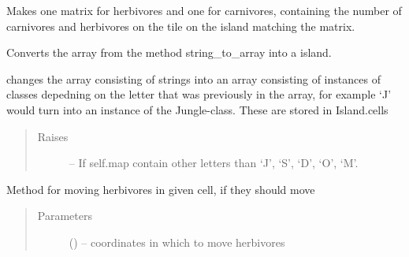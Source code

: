 \documentclass[a4paper,10pt,english]{sphinxmanual}
\begin{document}
\begin{fulllineitems}
\begin{fulllineitems}
Makes one matrix for herbivores and one for carnivores, containing
the number of carnivores and herbivores on the tile on the island
matching the matrix.

\end{fulllineitems}


\begin{fulllineitems}
\label{\detokenize{island:biosim.island.Island.array_to_island}}
Converts the array from the method string\_to\_array into a island.

changes the array consisting of strings into an array consisting of
instances of classes depedning on the letter that was previously in
the array, for example `J' would turn into an instance of the
Jungle-class. These are stored in Island.cells
\begin{quote}\begin{description}
\item[{Raises}] \leavevmode
{} -- If self.map contain other letters than `J', `S', `D', `O', `M'.

\end{description}\end{quote}

\end{fulllineitems}


\begin{fulllineitems}
\label{\detokenize{island:biosim.island.Island.cell_move_carnivores}}
Method for moving herbivores in given cell, if they should move
\begin{quote}\begin{description}
\item[{Parameters}] \leavevmode
{} () -- coordinates in which to move herbivores

\end{description}\end{quote}

\end{fulllineitems}



\end{fulllineitems}
\end{document}
